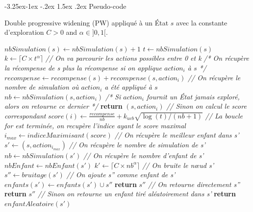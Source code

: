 \documentclass[pdftex,french, english]{article}	%
\makeatletter
\newcounter {subsubsubsection}[subsubsection]
\newcommand\subsubsubsection{\@startsection{subsubsubsection}{4}{\z@}%
                                     {-3.25ex\@plus -1ex \@minus -.2ex}%
                                     {1.5ex \@plus .2ex}%
                                     {\normalfont\normalsize\bfseries}}
\makeatother
\begin{document}
		\subsubsubsection{Pseudo-code} \label{dpw:code}

			\begin{algorithm}[H]
				\caption{Double progressive widening (PW) appliqué à un État $s$ avec la constante d'exploration $C > 0$ and $\alpha \in ]0, 1[$.}
				\label{alg:dpw}
					\begin{algorithmic}[1]
							\State $nbSimulation(s) \gets nbSimulation(s) + 1$ 
							\State $t \gets nbSimulation(s)$
							\State $k \gets \lceil{C \times t^{\alpha}}\rceil$
							\State \textit{// On va parcourir les actions possibles entre 0 et k}
								\State \textit{/* On récupère la récompense de s plus la récompense si on applique $action_{i}$ à $s$ */}
								\State $recompense \gets recompense(s) + recompense(s, action_{i})$
								\State \textit{// On récupère le nombre de simulation où $action_{i}$ a été appliqué à $s$}
								\State $nb \gets nbSimulation(s, action_{i})$
									\State \textit{/* Si $action_{i}$ fournit un État jamais exploré, alors on retourne ce dernier */}
									\State \textbf{return} $(s, action_{i})$
								\Else
									\State \textit{// Sinon on calcul le score correspondant}
									\State $score(i) \gets \frac{recompense}{nb} + \textbf{$k_{ucb}$}\sqrt{\log(t)/(nb + 1)}$							
								\EndIf
							\EndFor
							\State \textit{// La boucle for est terminée, on recupère l'indice ayant le score maximal}
							\State $i_{max} \gets indiceMaximisant(score)$
							\State \textit{// On récupère le meilleur enfant dans s'}
							\State $s' \gets (s, action_{i_{max}})$
							\State \textit{// On récupère le nombre de simulation de s'}
							\State $nb \gets nbSimulation(s')$
							\State \textit{// On récupère le nombre d'enfant de s'}
							\State $nbEnfant \gets nbEnfant(s')$
							\State $k' \gets \lceil{C \times nb^{\alpha}}\rceil$
								\State \textit{// On bruite le nœud s'}
								\State $s'' \gets bruitage(s')$
									\State \textit{// On ajoute s'' comme enfant de s'}
									\State $enfants(s') \gets enfants(s') \cup s''$
									\State \textbf{return} $s''$
								\Else
									\State \textit{// On retourne directement s''}
									\State \textbf{return} $s''$
								\EndIf
							\Else
								\State \textit{// Sinon on retourne un enfant tiré aléatoirement dans s'}
								\State \textbf{return} $enfantAleatoire(s')$
							\EndIf
						\EndFunction
					\end{algorithmic}
			\end{algorithm}
\end{document}
